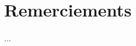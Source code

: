 \documentclass[a4paper,11pt,twoside]{StyleThese}
\begin{document}


    \makeflyleaf


\dominitoc


 \cleardoublepage

\section*{Remerciements}

...

\tableofcontents

\mainmatter












\appendix

%


%



\end{document}
